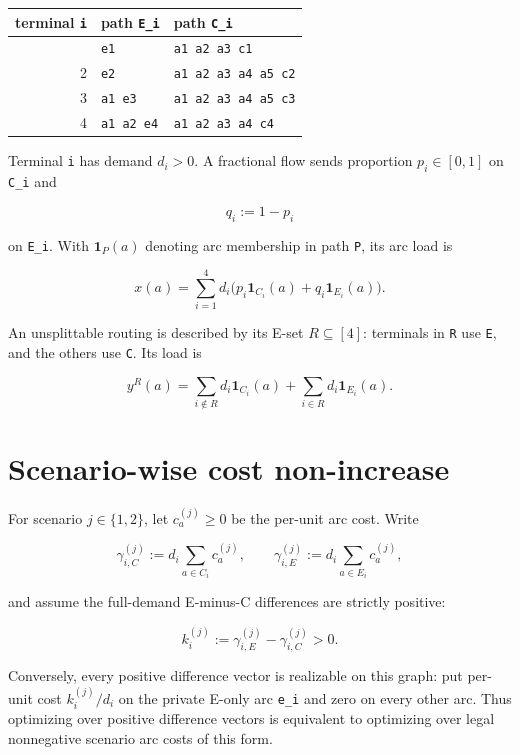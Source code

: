 \documentclass[
  11pt,
]{article}
\begin{document}
\begin{longtable}[]{@{}rll@{}}
\toprule\noalign{}
terminal \texttt{i} & path \texttt{E\_i} & path \texttt{C\_i} \\
\midrule\noalign{}
\endhead
\bottomrule\noalign{}
\endlastfoot
1 & \texttt{e1} & \texttt{a1\ a2\ a3\ c1} \\
2 & \texttt{e2} & \texttt{a1\ a2\ a3\ a4\ a5\ c2} \\
3 & \texttt{a1\ e3} & \texttt{a1\ a2\ a3\ a4\ a5\ c3} \\
4 & \texttt{a1\ a2\ e4} & \texttt{a1\ a2\ a3\ a4\ c4} \\
\end{longtable}

Terminal \texttt{i} has demand \(d_i>0\). A fractional flow sends
proportion \(p_i\in[0,1]\) on \texttt{C\_i} and

\[
q_i:=1-p_i
\]

on \texttt{E\_i}. With \(\mathbf 1_P(a)\) denoting arc membership in
path \texttt{P}, its arc load is

\[
x(a)=\sum_{i=1}^4 d_i
\bigl(p_i\mathbf 1_{C_i}(a)+q_i\mathbf 1_{E_i}(a)\bigr).
\tag{1}
\]

An unsplittable routing is described by its E-set \(R\subseteq[4]\):
terminals in \texttt{R} use \texttt{E}, and the others use \texttt{C}.
Its load is

\[
y^R(a)=
\sum_{i\notin R}d_i\mathbf 1_{C_i}(a)
+
\sum_{i\in R}d_i\mathbf 1_{E_i}(a).
\tag{2}
\]

\section{Scenario-wise cost
non-increase}\label{scenario-wise-cost-non-increase}

For scenario \(j\in\{1,2\}\), let \(c_a^{(j)}\ge0\) be the per-unit arc
cost. Write

\[
\gamma_{i,C}^{(j)}
:=d_i\sum_{a\in C_i}c_a^{(j)},
\qquad
\gamma_{i,E}^{(j)}
:=d_i\sum_{a\in E_i}c_a^{(j)},
\]

and assume the full-demand E-minus-C differences are strictly positive:

\[
k_i^{(j)}
:=\gamma_{i,E}^{(j)}-\gamma_{i,C}^{(j)}>0.
\tag{3}
\]

Conversely, every positive difference vector is realizable on this
graph: put per-unit cost \(k_i^{(j)}/d_i\) on the private E-only arc
\texttt{e\_i} and zero on every other arc. Thus optimizing over positive
difference vectors is equivalent to optimizing over legal nonnegative
scenario arc costs of this form.
\end{document}
